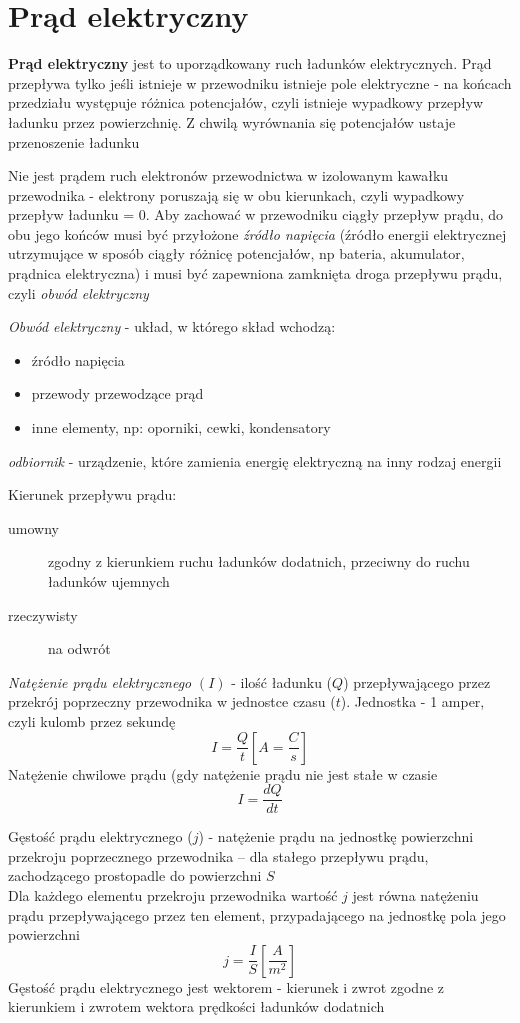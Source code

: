 \documentclass[a4paper,11pt]{article}
\begin{document}
\section{Prąd elektryczny}
\textbf{Prąd elektryczny} jest to uporządkowany ruch ładunków elektrycznych. Prąd przepływa tylko jeśli istnieje w przewodniku istnieje pole elektryczne - na końcach przedziału występuje różnica potencjałów, czyli istnieje wypadkowy przepływ ładunku przez powierzchnię. Z chwilą wyrównania się potencjałów ustaje przenoszenie ładunku

Nie jest prądem ruch elektronów przewodnictwa w izolowanym kawałku przewodnika - elektrony poruszają się w obu kierunkach, czyli wypadkowy przepływ ładunku = 0. Aby zachować w przewodniku ciągły przepływ prądu, do obu jego końców musi być przyłożone \emph{źródło napięcia} (źródło energii elektrycznej utrzymujące w sposób ciągły różnicę potencjałów, np bateria, akumulator, prądnica elektryczna) i musi być zapewniona zamknięta droga przepływu prądu, czyli \emph{obwód elektryczny}

\emph{Obwód elektryczny} - układ, w którego skład wchodzą:
\begin{itemize}
\item źródło napięcia
\item przewody przewodzące prąd
\item inne elementy, np: oporniki, cewki, kondensatory
\end{itemize}

\emph{odbiornik} - urządzenie, które zamienia energię elektryczną na inny rodzaj energii

Kierunek przepływu prądu:
\begin{description}
\item[umowny] zgodny z kierunkiem ruchu ładunków dodatnich, przeciwny do ruchu ładunków ujemnych
\item[rzeczywisty] na odwrót
\end{description}
\emph{Natężenie prądu elektrycznego} $(I)$ - ilość ładunku ($Q$) przepływającego przez przekrój poprzeczny przewodnika w jednostce czasu ($t$). Jednostka - 1 amper, czyli kulomb przez sekundę
$$I=\frac{Q}{t}\left[A=\frac{C}{s}\right]$$
Natężenie chwilowe prądu (gdy natężenie prądu nie jest stałe w czasie
$$I = \frac{dQ}{dt}$$

Gęstość prądu elektrycznego ($j$) - natężenie prądu na jednostkę powierzchni przekroju poprzecznego przewodnika -- dla stałego przepływu prądu, zachodzącego prostopadle do powierzchni $S$\\
Dla każdego elementu przekroju przewodnika wartość $j$ jest równa natężeniu prądu przepływającego przez ten element, przypadającego na jednostkę pola jego powierzchni
$$j = \frac{I}{S}\left[\frac{A}{m^2}\right]$$
Gęstość prądu elektrycznego jest wektorem - kierunek i zwrot zgodne z kierunkiem i zwrotem wektora prędkości ładunków dodatnich
\end{document}
